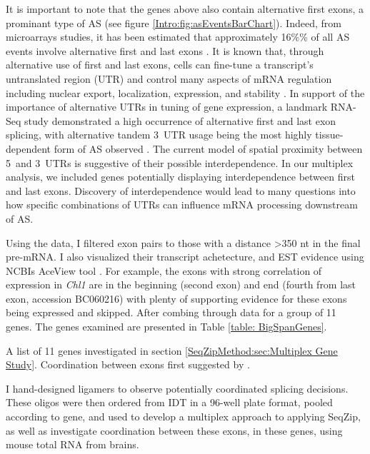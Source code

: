   It is important to note that the genes above also contain alternative first exons, a prominant type of AS (see figure \ref{Intro:fig:asEventsBarChart}). Indeed, from microarrays studies, it has been estimated that approximately 16\%\% of all AS events involve alternative first and last exons \citep{Bingham2008}. It is known that, through alternative use of first and last exons, cells can fine-tune a transcript’s untranslated region (UTR) and control many aspects of mRNA regulation including nuclear export, localization, expression, and stability \citep{Hughes2006}. In support of the importance of alternative UTRs in tuning of gene expression, a landmark RNA-Seq study demonstrated a high occurrence of alternative first and last exon splicing, with alternative tandem 3\textprime~UTR usage being the most highly tissue-dependent form of AS observed \citep{Wang2008}. The current model of spatial proximity between 5\textprime~and 3\textprime~UTRs is suggestive of their possible interdependence. In our multiplex analysis, we included genes potentially displaying interdependence between first and last exons. Discovery of interdependence would lead to many questions into how specific combinations of UTRs can influence mRNA processing downstream of AS.

  Using the \citet{Fagnani2007} data, I filtered exon pairs to those with a distance >350 nt in the final pre-mRNA. I also visualized their transcript achetecture, and EST evidence using NCBIs AceView tool \citep{Thierry-Mieg2006}. For example, the exons with strong correlation of expression in \textit{Chl1} are in the beginning (second exon) and end (fourth from last exon, accession BC060216) with plenty of supporting evidence for these exons being expressed and skipped. After combing through \citep{Fagnani2007} data for a group of 11 genes. The genes examined are presented in Table \ref{table: BigSpanGenes}.

  \begin{table} %
    \caption[Mouse genes with large sequence between suggested coordinated cassette exons]
      {
        A list of 11 genes investigated in section \ref{SeqZipMethod:sec:Multiplex Gene Study}. Coordination between exons first suggested by \citep{Fagnani2007}.
        }
    \label{table: BigSpanGenes}
    
    \end{table}

  I hand-designed ligamers to observe potentially coordinated splicing decisions. These oligos were then ordered from IDT in a 96-well plate format, pooled according to gene, and used to develop a multiplex approach to applying SeqZip, as well as investigate coordination between these exons, in these genes, using mouse total RNA from brains.

